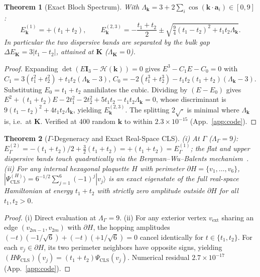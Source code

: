 \documentclass[11pt,a4paper]{article}
\newtheorem{theorem}{Theorem}[section]
\theoremstyle{definition}
\theoremstyle{remark}
\begin{document}
\begin{theorem}[Exact Bloch Spectrum]\label{thm:bloch}
With $\Lambda_{\mathbf{k}} = 3 + 2\sum_i\cos(\mathbf{k}\cdot\mathbf{a}_i)\in[0,9]$:
\begin{equation}
E^{(1)}_{\mathbf{k}} = +(t_1+t_2),\qquad E^{(2,3)}_{\mathbf{k}} = -\frac{t_1+t_2}{2} \pm \sqrt{\tfrac{9}{4}(t_1-t_2)^2 + t_1 t_2\Lambda_{\mathbf{k}}}.
\end{equation}
In particular the two dispersive bands are separated by the bulk gap $\Delta E_{\mathbf{K}} = 3|t_1-t_2|$, attained at $\mathbf{K}$ ($\Lambda_{\mathbf{K}}=0$).
\end{theorem}
\begin{proof}
Expanding $\det(E\mathbf{I}_3 - \mathcal{H}(\mathbf{k})) = 0$ gives $E^3 - C_1 E - C_0 = 0$ with $C_1 = 3(t_1^2+t_2^2) + t_1t_2(\Lambda_{\mathbf{k}}-3)$, $C_0 = -2(t_1^3+t_2^3)-t_1t_2(t_1+t_2)(\Lambda_{\mathbf{k}}-3)$. Substituting $E_0 = t_1+t_2$ annihilates the cubic. Dividing by $(E-E_0)$ gives
$E^2 + (t_1+t_2)E - 2t_1^2 - 2t_2^2 + 5t_1t_2 - t_1t_2\Lambda_{\mathbf{k}} = 0$,
whose discriminant is $9(t_1-t_2)^2 + 4t_1t_2\Lambda_{\mathbf{k}}$, yielding $E^{(2,3)}_{\mathbf{k}}$. The splitting $2\sqrt{\cdot}$ is minimal where $\Lambda_{\mathbf{k}}$ is, i.e.\ at $\mathbf{K}$. Verified at 400 random $\mathbf{k}$ to within $2.3\times10^{-15}$ (App.~\ref{app:code}).
\end{proof}

\begin{theorem}[$\Gamma$-Degeneracy and Exact Real-Space CLS]\label{thm:cls}
(i) At $\Gamma$ ($\Lambda_\Gamma = 9$): $E^{(2)}_\Gamma = -(t_1+t_2)/2 + \tfrac{3}{2}(t_1+t_2) = +(t_1+t_2) = E^{(1)}_\Gamma$; the flat and upper dispersive bands touch quadratically via the Bergman--Wu--Balents mechanism~\cite{bergman2008}. (ii) For any internal hexagonal plaquette $H$ with perimeter $\partial H = \{v_1,\dots,v_6\}$,
$|\Psi^{(H)}_{\text{CLS}}\rangle = 6^{-1/2}\sum_{j=1}^6(-1)^j|v_j\rangle$
is an exact eigenstate of the full real-space Hamiltonian at energy $t_1+t_2$ with strictly zero amplitude outside $\partial H$ for all $t_1,t_2>0$.
\end{theorem}
\begin{proof}
(i) Direct evaluation at $\Lambda_\Gamma=9$. (ii) For any exterior vertex $v_{\text{ext}}$ sharing an edge $(v_{2m-1},v_{2m})$ with $\partial H$, the hopping amplitudes $(-t)(-1/\sqrt6) + (-t)(+1/\sqrt6) = 0$ cancel identically for $t \in \{t_1,t_2\}$. For each $v_j\in\partial H$, its two perimeter neighbors have opposite signs, yielding $(H\Psi_{\text{CLS}})(v_j) = (t_1+t_2)\Psi_{\text{CLS}}(v_j)$. Numerical residual $2.7\times10^{-17}$ (App.~\ref{app:code}).
\end{proof}
\end{document}
